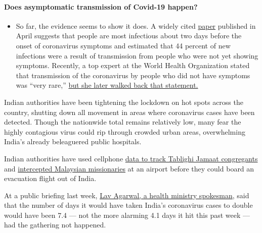 \begin{itemize}
{  \paragraph{Does asymptomatic transmission of Covid-19
  happen?}\label{does-asymptomatic-transmission-of-covid-19-happen}}

  \begin{itemize}
  \tightlist
  \item
    So far, the evidence seems to show it does. A widely cited
    \href{https://www.nature.com/articles/s41591-020-0869-5}{paper}
    published in April suggests that people are most infectious about
    two days before the onset of coronavirus symptoms and estimated that
    44 percent of new infections were a result of transmission from
    people who were not yet showing symptoms. Recently, a top expert at
    the World Health Organization stated that transmission of the
    coronavirus by people who did not have symptoms was ``very rare,''
    \href{https://www.nytimes.com/2020/06/09/world/coronavirus-updates.html?action=click\&pgtype=Article\&state=default\&region=MAIN_CONTENT_3\&context=storylines_faq\#link-1f302e21}{but
    she later walked back that statement.}
  \end{itemize}
\end{itemize}

Indian authorities have been tightening the lockdown on hot spots across
the country, shutting down all movement in areas where coronavirus cases
have been detected. Though the nationwide total remains relatively low,
many fear the highly contagious virus could rip through crowded urban
areas, overwhelming India's already beleaguered public hospitals.

Indian authorities have used cellphone
\href{https://www.thestatesman.com/india/police-using-cell-phone-data-to-trace-people-who-attended-tablighi-jamaat-event-in-delhi-1502873974.html}{data
to track Tablighi Jamaat congregants} and
\href{https://www.thehindu.com/news/national/tamil-nadu/coronavirus-10-malaysians-who-attended-tablighi-jamaat-event-nabbed-by-ccb-officials-at-chennai-airport/article31263055.ece}{intercepted
Malaysian missionaries} at an airport before they could board an
evacuation flight out of India.

At a public briefing last week,
\href{https://economictimes.indiatimes.com/news/politics-and-nation/rate-of-doubling-of-covid-19-cases-4-1-days-without-tablighi-jamaat-incident-it-would-have-been-7-4-government/articleshow/74994181.cms}{Lav
Agarwal, a health ministry spokesman}, said that the number of days it
would have taken India's coronavirus cases to double would have been 7.4
--- not the more alarming 4.1 days it hit this past week --- had the
gathering not happened.

